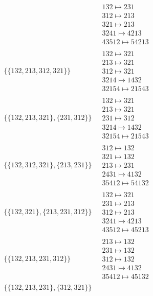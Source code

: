 \begin{scriptsize}
\begin{align}
\ 
&
\begin{matrix}
132 \mapsto 231\\312 \mapsto 213\\321 \mapsto 213\\3241 \mapsto 4213\\43512 \mapsto 54213
\end{matrix}
\\
\{\{132, 213, 312, 321\}\}
\ 
&
\begin{matrix}
132 \mapsto 321\\213 \mapsto 321\\312 \mapsto 321\\3214 \mapsto 1432\\32154 \mapsto 21543
\end{matrix}
\\
\{\{132, 213, 321\}, \{231, 312\}\}
\ 
&
\begin{matrix}
132 \mapsto 321\\213 \mapsto 321\\231 \mapsto 312\\3214 \mapsto 1432\\32154 \mapsto 21543
\end{matrix}
\\
\{\{132, 312, 321\}, \{213, 231\}\}
\ 
&
\begin{matrix}
312 \mapsto 132\\321 \mapsto 132\\213 \mapsto 231\\2431 \mapsto 4132\\35412 \mapsto 54132
\end{matrix}
\\
\{\{132, 321\}, \{213, 231, 312\}\}
\ 
&
\begin{matrix}
132 \mapsto 321\\231 \mapsto 213\\312 \mapsto 213\\3241 \mapsto 4213\\43512 \mapsto 45213
\end{matrix}
\\
\{\{132, 213, 231, 312\}\}
\ 
&
\begin{matrix}
213 \mapsto 132\\231 \mapsto 132\\312 \mapsto 132\\2431 \mapsto 4132\\35412 \mapsto 45132
\end{matrix}
\\
\{\{132, 213, 231\}, \{312, 321\}\}

\end{align}
\end{scriptsize}
